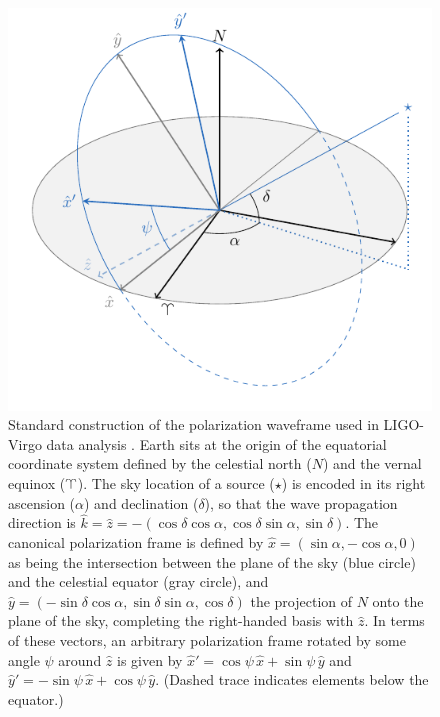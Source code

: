 \documentclass[aps,prd,twocolumn,superscriptaddress,preprintnumbers,floatfix,nofootinbib]{revtex4-2}
\begin{document}
\begin{figure}
\includegraphics[width=0.9\columnwidth]{diagram_waveframe.pdf}
\caption{Standard construction of the polarization waveframe used in LIGO-Virgo data analysis \cite{LALSuite:wave}. Earth sits at the origin of the equatorial coordinate system defined by the celestial north ($N$) and the vernal equinox ($\vernal$). The sky location of a source ($\star$) is encoded in its right ascension ($\alpha$) and declination ($\delta$), so that the wave propagation direction is $\hat{k}=\hat{z}=-(\cos\delta \cos\alpha, \cos\delta\sin\alpha, \sin\delta)$. The canonical polarization frame is defined by $\hat{x}=(\sin\alpha, -\cos\alpha,0)$ as being the intersection between the plane of the sky (blue circle) and the celestial equator (gray circle), and $\hat{y}=(-\sin\delta \cos\alpha, \sin\delta\sin\alpha, \cos\delta)$ the projection of $N$ onto the plane of the sky, completing the right-handed basis with $\hat{z}$.
In terms of these vectors, an arbitrary polarization frame rotated by some angle $\psi$ around $\hat{z}$ is given by $\hat{x}'=\cos\psi\,\hat{x} + \sin\psi\,\hat{y}$ and $\hat{y}'=-\sin\psi\,\hat{x} + \cos\psi\,\hat{y}$. (Dashed trace indicates elements below the equator.)}
\label{fig:diagram_waveframe}
\end{figure}
\end{document}
